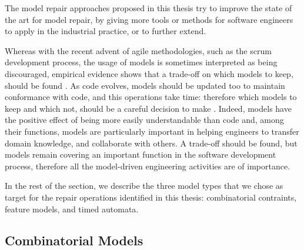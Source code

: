 The model repair approaches proposed in this thesis try to improve the state of the art for model repair, by giving more tools or methods for software engineers to apply in the industrial practice, or to further extend.




Whereas with the recent advent of agile methodologies, such as the scrum development process, the usage of models is sometimes interpreted as being discouraged, empirical evidence shows that a trade-off on which models to keep, should be found \cite{blasband2016rise}. As code evolves, models should be updated too to maintain conformance with code, and this operations take time: therefore which models to keep and which not, should be a careful decision to make \cite{blasband2016rise}.
Indeed, models have the positive effect of being more easily understandable than code and, among their functions, models are particularly important in helping engineers to transfer domain knowledge, and collaborate with others.
A trade-off should be found, but models remain covering an important function in the software development process, therefore all the model-driven engineering activities are of importance.

In the rest of the section, we describe the three model types that we chose as target for the repair operations identified in this thesis: combinatorial contraints, feature models, and timed automata.

\subsection{Combinatorial Models}


